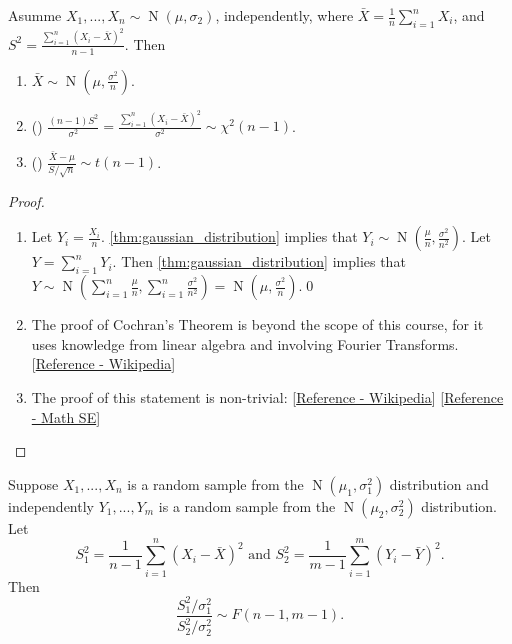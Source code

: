 \documentclass[notoc,notitlepage]{tufte-book}
\DeclareMathOperator{\Nor}{N }
\begin{document}
\begin{thm}
\label{thm:properties_of_the_gaussian_distribution}
  Asumme $X_1, ..., X_n \sim \Nor( \mu, \sigma_2 )$, independently, where $\bar{X} = \frac{1}{n} \sum_{i=1}^{n} X_i$, and $S^2 = \frac{\sum_{i=1}^{n} ( X_i - \bar{X} )^2}{n - 1}$. Then
  \begin{enumerate}
    \item $\bar{X} \sim \Nor\left( \mu, \frac{\sigma^2}{n} \right)$.
    \item () $\frac{( n - 1 ) S^2}{\sigma^2} = \frac{\sum_{i=1}^{n} (X_i - \bar{X})^2}{\sigma^2} \sim \chi^2 ( n - 1 )$.
    \item () $\frac{\bar{X} - \mu}{S / \sqrt{n}} \sim t(n - 1)$.
  \end{enumerate}
\end{thm}

\begin{proof}
  \begin{enumerate}
    \item Let $Y_i = \frac{X_i}{n}$. \cref{thm:gaussian_distribution} implies that $Y_i \sim \Nor\left( \frac{\mu}{n} , \frac{\sigma^2}{n^2} \right)$. Let $Y = \sum_{i=1}^{n} Y_i$. Then \cref{thm:gaussian_distribution} implies that $Y \sim \Nor\left( \sum_{i=1}^{n} \frac{\mu}{n}, \sum_{i=1}^{n} \frac{\sigma^2}{n^2} \right) = \Nor\left( \mu, \frac{\sigma^2}{n} \right)$.\qed
    \item The proof of Cochran's Theorem is beyond the scope of this course, for it uses knowledge from linear algebra and involving Fourier Transforms. [\href{https://en.wikipedia.org/wiki/Cochran\%27s_theorem}{Reference - Wikipedia}]
    \item The proof of this statement is non-trivial: [\href{https://en.wikipedia.org/wiki/Student\%27s\_t\-distribution}{Reference - Wikipedia}] [\href{https://math.stackexchange.com/questions/474733/derivation-of-the-density-function-of-student-t-distribution-from-this-big-integ}{Reference - Math SE}]
 \end{enumerate}
\end{proof}

\begin{thm}[F Distribution]
\label{thm:f_distribution}
Suppose $X_1, ..., X_n$ is a random sample from the $\Nor(\mu_1, \sigma_1^2)$ distribution and independently $Y_1, ..., Y_m$ is a random sample from the $\Nor(\mu_2, \sigma_2^2)$ distribution. Let
\begin{equation*}
  S_1^2 = \frac{1}{n - 1} \sum_{i=1}^{n} (X_i - \bar{X})^2 \text{ and } S_2^2 = \frac{1}{m - 1} \sum_{i=1}^{m} (Y_i - \bar{Y})^2.
\end{equation*}
Then
\begin{equation*}
  \frac{S_1^2 / \sigma_1^2}{S_2^2 / \sigma_2^2} \sim F( n - 1, m - 1 ).
\end{equation*}
\end{thm}
\end{document}
